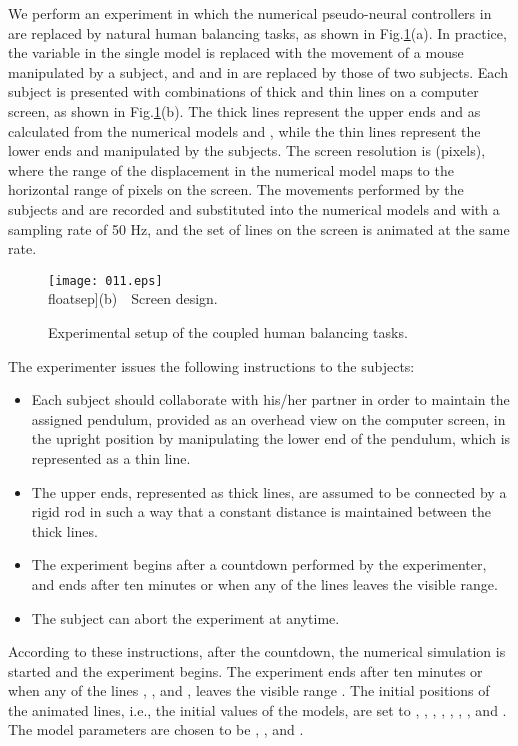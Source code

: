 \documentclass[12pt,a4paper]{ijicic}
\def\lfig#1{\label{fig:#1}}\def\rfig#1{Fig.\ref{fig:#1}}
\begin{document}
We perform an experiment in which the numerical pseudo-neural
controllers in  are replaced by natural human balancing
tasks, as shown in \rfig{setup}(a).  In practice, the variable 
in the single model  is replaced with the movement of
a mouse manipulated by a subject, and  and  in
 are replaced by those of two subjects.  Each subject is
presented with combinations of thick and thin lines on a computer
screen, as shown in \rfig{setup}(b). The thick lines represent the upper
ends  and  as calculated from the numerical models
 and , while the thin lines represent
the lower ends  and  manipulated by the subjects.  The
screen resolution is  (pixels), where the range of the
displacement  in the numerical model maps to the horizontal
range of pixels  on the screen.  The movements performed by
the subjects  and  are recorded and substituted into the
numerical models  and  with a sampling
rate of 50 Hz, and the set of lines on the screen is animated at the
same rate.

\begin{figure}[p]
  \centering\par
  \texttt{[image: 011.eps]}
 \\floatsep]{(b)~~Screen design.}
\caption{Experimental setup of the coupled human balancing tasks.}
\lfig{setup}
\end{figure}

The experimenter issues the following instructions to the subjects:
\begin{itemize}
 \item Each subject should collaborate with his/her partner in order to
       maintain the assigned pendulum, provided as an overhead view on
       the computer screen, in the upright position by manipulating the
       lower end of the pendulum, which is represented as a thin line.
 \item The upper ends, represented as thick lines, are assumed to be
       connected by a rigid rod in such a way that a constant distance
       is maintained between the thick lines.
 \item The experiment begins after a countdown performed by the
       experimenter, and ends after ten minutes or when any of the lines
       leaves the visible range.
 \item The subject can abort the experiment at anytime.
\end{itemize}
According to these instructions, after the countdown, the numerical
simulation is started and the experiment begins.  The experiment ends
after ten minutes or when any of the lines , , and ,
 leaves the visible range .  The initial positions of
the animated lines, i.e., the initial values of the models, are set to
, , , , , , , and
.  The model parameters
are chosen to be , , and .
\end{document}
